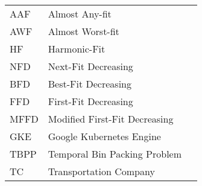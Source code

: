 \begin{flushleft}
\begin{tabular}{l p{0.8\linewidth}}
AAF      & Almost Any-fit \\
AWF      & Almost Worst-fit \\
HF       & Harmonic-Fit \\ 
NFD      & Next-Fit Decreasing \\
BFD      & Best-Fit Decreasing \\
FFD      & First-Fit Decreasing \\
MFFD     & Modified First-Fit Decreasing \\
GKE      & Google Kubernetes Engine \\
TBPP     & Temporal Bin Packing Problem \\
TC       & Transportation Company \\

\end{tabular}
\end{flushleft}

